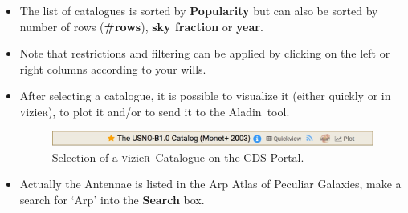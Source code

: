 \documentclass [a4paper, 12pt]{article}
\newcommand{\aladin}{{\textsc{A}{ladin}}}
\newcommand{\vizier}{{\textsc{v}izie\textsc{r}}}
\begin{document}
\begin{itemize}
\item The list of catalogues is sorted by \textbf{Popularity} but can 
also be sorted by number of rows (\textbf{\#rows}), \textbf{sky 
fraction} or \textbf{year}. 
\item Note that restrictions and filtering can be applied by clicking 
on the left or right columns according to your wills.
\item After selecting a catalogue, it is possible to visualize it (either 
quickly or in \vizier), to plot it and/or to send it to the \aladin\ 
tool.
\begin{figure}[H]
\center
\includegraphics[width=1  \textwidth]{../images/cdsportal_table_usno.jpg}
\caption{Selection of a \vizier\ Catalogue on the CDS Portal.}
\label{fig:cdsportal5}
\end{figure}
\item Actually the Antennae is listed in the Arp Atlas of Peculiar 
Galaxies, make a search for `Arp' into the \textbf{Search} box.


\end{itemize}
\end{document}

